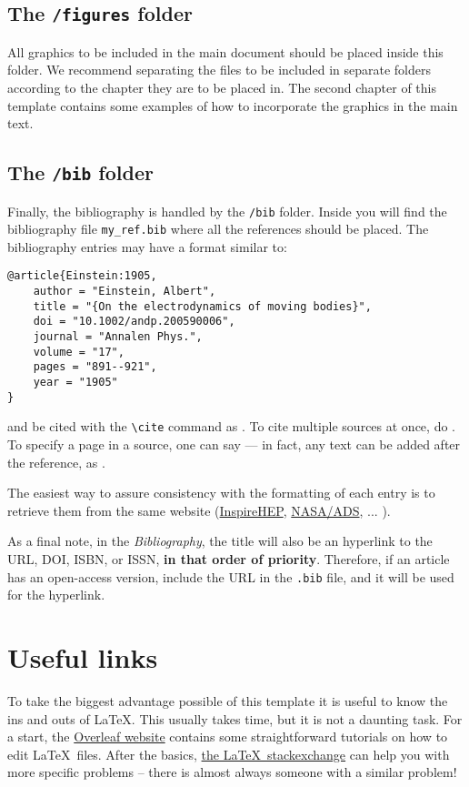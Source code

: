 \subsection{The {\normalfont\texttt{/figures}} folder} %
%
All graphics to be included in the main document should be placed inside this folder. We recommend separating the files to be included in separate folders according to the chapter they are to be placed in. The second chapter of this template contains some examples of how to incorporate the graphics in the main text.

\subsection{The {\normalfont\texttt{/bib}} folder} %

Finally, the bibliography is handled by the \texttt{/bib} folder. Inside you will find the bibliography file \texttt{my\_ref.bib} where all the references should be placed. The bibliography entries may have a format similar to:

\begin{verbatim}
@article{Einstein:1905,
	author = "Einstein, Albert",
	title = "{On the electrodynamics of moving bodies}",
	doi = "10.1002/andp.200590006",
	journal = "Annalen Phys.",
	volume = "17",
	pages = "891--921",
	year = "1905"
}
\end{verbatim}
%
and be cited with the \verb|\cite| command as \cite{Einstein:1905}. To cite multiple sources at once, do \cite{Mertig:1990:feyncalc,Shtabovenko:2016:feyncalc,Shtabovenko:2020:feyncalc}. To specify a page in a source, one can say \cite[p.~500]{Dokshitzer:1991} --- in fact, any text can be added after the reference, as \cite[Any text you might want]{Peskin:1995}.

The easiest way to assure consistency with the formatting of each entry is to retrieve them from the same website (\href{https://inspirehep.net/}{InspireHEP}, \href{https://ui.adsabs.harvard.edu/}{NASA/ADS}, ... ).

As a final note, in the \textit{Bibliography}, the title will also be an hyperlink to the URL, DOI, ISBN, or ISSN, \textbf{in that order of priority}. Therefore, if an article has an open-access version, include the URL in the \texttt{.bib} file, and it will be used for the hyperlink.

\section{Useful links}
%
To take the biggest advantage possible of this template it is useful to know the ins and outs of \LaTeX. This usually takes time, but it is not a daunting task. For a start, the \href{https://www.overleaf.com/learn}{Overleaf website} contains some straightforward tutorials on how to edit \LaTeX\, files. After the basics, \href{https://tex.stackexchange.com}{the \LaTeX\, stackexchange} can help you with more specific problems -- there is almost always someone with a similar problem!

